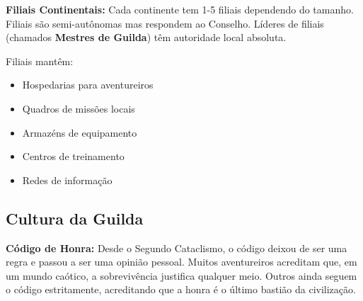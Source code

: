 \textbf{\ringmfamily Filiais Continentais:}
Cada continente tem 1-5 filiais dependendo do tamanho. Filiais são semi-autônomas mas respondem ao Conselho. Líderes de filiais (chamados \textbf{Mestres de Guilda}) têm autoridade local absoluta.

Filiais mantêm:
\begin{itemize}
    \item Hospedarias para aventureiros
    \item Quadros de missões locais
    \item Armazéns de equipamento
    \item Centros de treinamento
    \item Redes de informação
\end{itemize}

\subsection*{Cultura da Guilda}

\textbf{\ringmfamily Código de Honra:}
Desde o Segundo Cataclismo, o código deixou de ser uma regra e passou a ser uma opinião pessoal. Muitos aventureiros acreditam que, em um mundo caótico, a sobrevivência justifica qualquer meio. Outros ainda seguem o código estritamente, acreditando que a honra é o último bastião da civilização.

